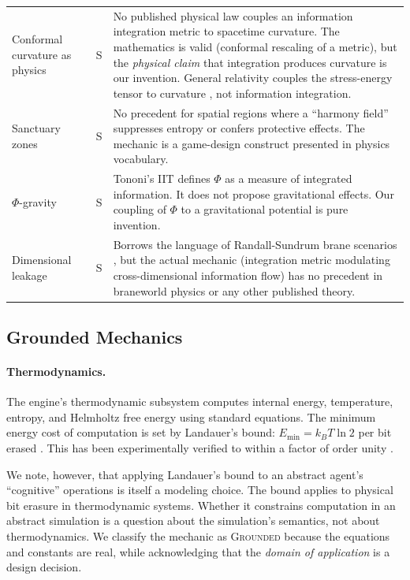 \documentclass[12pt,a4paper]{article}
\begin{document}
\begin{table}[!htbp]
\begin{tabularx}{\textwidth}{L{3.2cm} c L{8.5cm}}
Conformal curvature as physics
  & S
  & No published physical law couples an information
    integration metric to spacetime curvature.  The
    mathematics is valid (conformal rescaling of a
    metric), but the \emph{physical claim} that
    integration produces curvature is our invention.
    General relativity couples the stress-energy tensor
    to curvature \citep{carroll2004}, not information
    integration. \\[6pt]
Sanctuary zones
  & S
  & No precedent for spatial regions where a ``harmony
    field'' suppresses entropy or confers protective
    effects.  The mechanic is a game-design construct
    presented in physics vocabulary. \\[6pt]
$\Phi$-gravity
  & S
  & Tononi's IIT \citep{tononi2004} defines $\Phi$ as
    a measure of integrated information.  It does not
    propose gravitational effects.  Our coupling of
    $\Phi$ to a gravitational potential is pure
    invention. \\[6pt]
Dimensional leakage
  & S
  & Borrows the language of Randall-Sundrum brane
    scenarios \citep{randall1999}, but the actual
    mechanic (integration metric modulating
    cross-dimensional information flow) has no
    precedent in braneworld physics or any other
    published theory. \\
\bottomrule
\end{tabularx}
\end{table}

\subsection{Grounded Mechanics}

\paragraph{Thermodynamics.}
The engine's thermodynamic subsystem computes internal energy,
temperature, entropy, and Helmholtz free energy using standard
equations.  The minimum energy cost of computation is set by
Landauer's bound: $E_{\min} = k_B T \ln 2$ per bit erased
\citep{landauer1961}.  This has been experimentally verified to
within a factor of order unity \citep{berut2012}.

We note, however, that applying Landauer's bound to an abstract
agent's ``cognitive'' operations is itself a modeling choice.
The bound applies to physical bit erasure in thermodynamic
systems.  Whether it constrains computation in an abstract
simulation is a question about the simulation's semantics, not
about thermodynamics.  We classify the mechanic as
\textsc{Grounded} because the equations and constants are real,
while acknowledging that the \emph{domain of application} is
a design decision.
\end{document}
